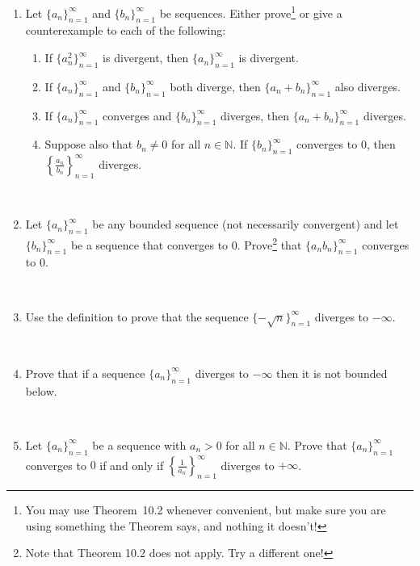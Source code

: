 \documentclass{amsart}
\def\N{\mathbb N}
\begin{document}
\begin{enumerate}

\item Let $\{a_n\}_{n=1}^\infty$ and $\{b_n\}_{n=1}^\infty$ be sequences. Either prove\footnote{You may use Theorem~10.2 whenever convenient, but make sure you are using something the Theorem says, and nothing it doesn't!} or give a counterexample to each of the following:
\begin{enumerate}
\item If $\{a_n^2\}_{n=1}^\infty$ is divergent, then $\{a_n\}_{n=1}^\infty$ is divergent.
\item If $\{a_n\}_{n=1}^\infty$ and $\{b_n\}_{n=1}^\infty$ both diverge, then $\{a_n + b_n\}_{n=1}^\infty$ also diverges.
\item If $\{a_n\}_{n=1}^\infty$ converges and $\{b_n\}_{n=1}^\infty$ diverges, then $\{a_n + b_n\}_{n=1}^\infty$ diverges.
\item Suppose also that $b_n\neq 0$ for all $n\in \N$. If $\{b_n\}_{n=1}^\infty$ converges to $0$, then $\displaystyle \left\{\frac{a_n}{b_n}\right\}_{n=1}^\infty$ diverges.
\end{enumerate}

\

\item Let $\{a_n\}_{n=1}^\infty$ be any bounded sequence (not necessarily convergent) and let $\{b_n\}_{n=1}^\infty$ be a sequence that converges to $0$. Prove\footnote{Note that Theorem 10.2 does not apply. Try a different one!} that $\{a_n b_n\}_{n=1}^\infty$ converges to $0$.

\

\item Use the definition to prove that the sequence $\{ -\sqrt{n} \}_{n=1}^\infty$ diverges to $-\infty$.


\

\item Prove that if a sequence $\{ a_n\}_{n=1}^\infty$ diverges to $-\infty$ then it is not bounded below. 

\

\item Let $\{a_n\}_{n=1}^\infty$ be a sequence with $a_n>0$ for all $n\in \N$. Prove that $\{a_n\}_{n=1}^\infty$ converges to $0$ if and only if $\displaystyle \left\{\frac{1}{a_n}\right \}_{n=1}^\infty$ diverges to $+\infty$. 





\end{enumerate}
\end{document}
